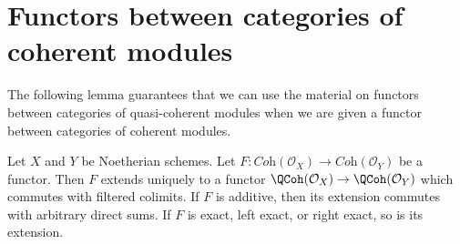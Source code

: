 \section{Functors between categories of coherent modules}
\label{section-functor-coherent}

\noindent
The following lemma guarantees that we can use the material on
functors between categories of quasi-coherent modules when
we are given a functor between categories of coherent modules.

\begin{lemma}
\label{lemma-functor-coherent}
Let $X$ and $Y$ be Noetherian schemes. Let
$F : \textit{Coh}(\mathcal{O}_X) \to \textit{Coh}(\mathcal{O}_Y)$
be a functor. Then $F$ extends uniquely to a functor
$\QCoh(\mathcal{O}_X) \to \QCoh(\mathcal{O}_Y)$
which commutes with filtered colimits.
If $F$ is additive, then its extension commutes with arbitrary direct sums.
If $F$ is exact, left exact, or right exact, so is its extension.
\end{lemma}

